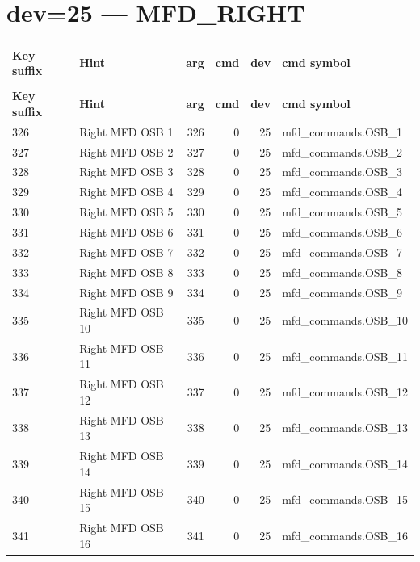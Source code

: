 \documentclass[10pt,a4paper]{article}
\begin{document}
\section{dev=25 — MFD\_RIGHT}
\begin{longtable}{>{\ttfamily\small}p{38mm} >{\small}p{72mm} r r r >{\ttfamily\small}p{48mm}}
\toprule
\textbf{Key suffix} & \textbf{Hint} & \textbf{arg} & \textbf{cmd} & \textbf{dev} & \textbf{cmd symbol} \\
\midrule
\endfirsthead
\multicolumn{6}{l}{\small\itshape continued\ldots}\\
\toprule
\textbf{Key suffix} & \textbf{Hint} & \textbf{arg} & \textbf{cmd} & \textbf{dev} & \textbf{cmd symbol} \\
\midrule
\endhead
\bottomrule
\endfoot
\rowcolor{rowodd}
  326 & Right MFD OSB 1 & 326 & 0 & 25 & mfd\_commands.OSB\_1 \\
  327 & Right MFD OSB 2 & 327 & 0 & 25 & mfd\_commands.OSB\_2 \\
\rowcolor{rowodd}
  328 & Right MFD OSB 3 & 328 & 0 & 25 & mfd\_commands.OSB\_3 \\
  329 & Right MFD OSB 4 & 329 & 0 & 25 & mfd\_commands.OSB\_4 \\
\rowcolor{rowodd}
  330 & Right MFD OSB 5 & 330 & 0 & 25 & mfd\_commands.OSB\_5 \\
  331 & Right MFD OSB 6 & 331 & 0 & 25 & mfd\_commands.OSB\_6 \\
\rowcolor{rowodd}
  332 & Right MFD OSB 7 & 332 & 0 & 25 & mfd\_commands.OSB\_7 \\
  333 & Right MFD OSB 8 & 333 & 0 & 25 & mfd\_commands.OSB\_8 \\
\rowcolor{rowodd}
  334 & Right MFD OSB 9 & 334 & 0 & 25 & mfd\_commands.OSB\_9 \\
  335 & Right MFD OSB 10 & 335 & 0 & 25 & mfd\_commands.OSB\_10 \\
\rowcolor{rowodd}
  336 & Right MFD OSB 11 & 336 & 0 & 25 & mfd\_commands.OSB\_11 \\
  337 & Right MFD OSB 12 & 337 & 0 & 25 & mfd\_commands.OSB\_12 \\
\rowcolor{rowodd}
  338 & Right MFD OSB 13 & 338 & 0 & 25 & mfd\_commands.OSB\_13 \\
  339 & Right MFD OSB 14 & 339 & 0 & 25 & mfd\_commands.OSB\_14 \\
\rowcolor{rowodd}
  340 & Right MFD OSB 15 & 340 & 0 & 25 & mfd\_commands.OSB\_15 \\
  341 & Right MFD OSB 16 & 341 & 0 & 25 & mfd\_commands.OSB\_16 \\

\end{longtable}
\end{document}
